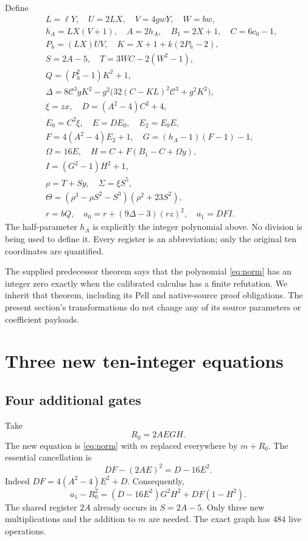 \documentclass[11pt]{article}
\theoremstyle{definition}
\theoremstyle{remark}
\begin{document}
Define
\begin{align*}
 &L=\ell Y,\quad U=2LX,\quad V=4gwY,\quad W=bw,\\
 &h_A=LX(V+1),\quad A=2h_A,\quad B_1=2X+1,\quad C=6c_0-1,\\
 &P_h=(LX)UV,\quad K=X+1+k(2P_h-2),\\
 &S=2A-5,\quad T=3WC-2(W^2-1),\\
 &Q=(P_h^2-1)K^2+1,\\
 &\Delta=8\mathcal C^3gK^2
       -g^2\bigl(32(C-KL)^2\mathcal C^3+g^2K^2\bigr),\\
 &\xi=zx,\quad D=(A^2-4)C^2+4,\\
 &E_0=C^2\xi,\quad E=DE_0,\quad E_2=E_0E,\\
 &F=4(A^2-4)E_2+1,\quad G=(h_A-1)(F-1)-1,\\
 &\Omega=16E,\quad H=C+F(B_1-C+\Omega y),\\
 &I=(G^2-1)H^2+1,\\
 &\rho=T+Sy,\quad \Sigma=\xi S^5,\\
 &\Theta=(\rho^3-\rho S^2-S^3)(\rho^2+23S^2),\\
 &r=bQ,\quad a_0=r+(9\Delta-3)(rz)^2,\quad a_1=DFI.
\end{align*}
The half-parameter $h_A$ is explicitly the integer polynomial above.
No division is being used to define it. Every register is an abbreviation;
only the original ten coordinates are quantified.

The supplied predecessor theorem says that the polynomial \eqref{eq:norm}
has an integer zero exactly when the calibrated calculus has a finite
refutation. We inherit that theorem, including its Pell and native-source
proof obligations. The present section's transformations do not change
any of its source parameters or coefficient payloads.

\section{Three new ten-integer equations}

\subsection{Four additional gates}

Take
\begin{equation}\label{eq:R0}
 R_0=2AEGH.
\end{equation}
The new equation is \eqref{eq:norm} with $m$ replaced everywhere by
$m+R_0$. The essential cancellation is
\begin{equation}\label{eq:first-defect}
 DF-(2AE)^2=D-16E^2.
\end{equation}
Indeed $DF=4(A^2-4)E^2+D$. Consequently,
\begin{equation}\label{eq:R0def}
 a_1-R_0^2=(D-16E^2)G^2H^2+DF(1-H^2).
\end{equation}
The shared register $2A$ already occurs in $S=2A-5$. Only three new
multiplications and the addition to $m$ are needed. The exact graph has
$484$ live operations.
\end{document}

